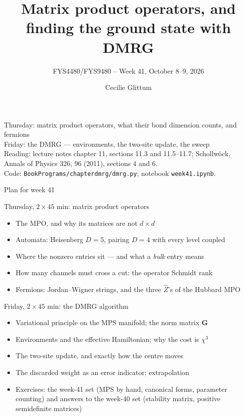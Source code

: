 \documentclass[aspectratio=169,10pt]{beamer}
\title{Matrix product operators, and finding the ground state with DMRG}
\subtitle{FYS4480/FYS9480 -- Week 41, October 8--9, 2026}
\author{Cecilie Glittum}
\institute{Department of Physics,\\
University of Oslo, Norway}
\date{}
\newcommand{\bmat}[1]{\bm{#1}}
\begin{document}
\begin{frame}[plain]
  \vfill
  \begin{center}\small
  Thursday: matrix product operators, what their bond dimension counts, and fermions\\
  Friday: the DMRG --- environments, the two-site update, the sweep\\[0.8em]
  {\footnotesize Reading: lecture notes chapter 11, sections 11.3 and 11.5--11.7; Schollw\"ock, Annals of Physics 326, 96 (2011), sections 4 and 6.\\
  Code: \texttt{BookPrograms/chapterdmrg/dmrg.py}; notebook \texttt{week41.ipynb}.}
  \end{center}
\end{frame}

\begin{frame}[shrink=5]{Plan for week 41}
  \begin{block}{Thursday, $2\times45$ min: matrix product operators}
    \begin{itemize}
      \item The MPO, and why its matrices are not $d\times d$
      \item Automata: Heisenberg $D=5$, pairing $D=4$ with every level coupled
      \item Where the nonzero entries sit --- and what a \emph{bulk} entry means
      \item How many channels must cross a cut: the operator Schmidt rank
      \item Fermions: Jordan--Wigner strings, and the three $\hat Z$'s of the Hubbard MPO
    \end{itemize}
  \end{block}
  \begin{block}{Friday, $2\times45$ min: the DMRG algorithm}
    \begin{itemize}
      \item Variational principle on the MPS manifold; the norm matrix $\bmat G$
      \item Environments and the effective Hamiltonian; why the cost is $\chi^3$
      \item The two-site update, and exactly how the centre moves
      \item The discarded weight as an error indicator; extrapolation
      \item Exercises: the week-41 set (MPS by hand, canonical forms, parameter counting) and answers to the week-40 set (stability matrix, positive semidefinite matrices)
    \end{itemize}
  \end{block}
\end{frame}
\end{document}
